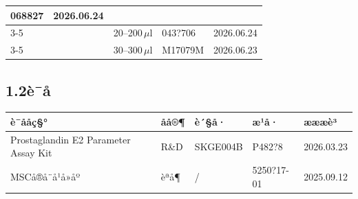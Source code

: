 \documentclass[UTF8,10pt,a4paper,fontset=fandol]{ctexart}
\newcommand{\fieldvalue}[1]{#1}
\newcommand{\handwritten}[1]{#1}
\begin{document}
\begin{tabularx}{\textwidth}{|X|X|X|X|X|}
\fieldvalue{\handwritten{068827}} &
\fieldvalue{\handwritten{2026.06.24}}
\\ \cline{3-5}
 & &
\fieldvalue{\handwritten{20--200\,\(\mu\)l}} &
\fieldvalue{\handwritten{043?706}} &
\fieldvalue{\handwritten{2026.06.24}}
\\ \cline{3-5}
 & &
\fieldvalue{\handwritten{30--300\,\(\mu\)l}} &
\fieldvalue{\handwritten{M17079M}} &
\fieldvalue{\handwritten{2026.06.23}}
\\ \hline
\end{tabularx}
\normalsize

\subsection*{1.2\quad è¯å}

\begin{tabularx}{\textwidth}{|X|l|X|X|X|}
\hline
è¯ååç§° & åå®¶ & è´§å· & æ¹å· & æææè³ \\ \hline
\fieldvalue{Prostaglandin E2 Parameter Assay Kit} &
\fieldvalue{R\&D} &
\fieldvalue{SKGE004B} &
\fieldvalue{\handwritten{P482?8}} &
\fieldvalue{\handwritten{2026.03.23}}
\\ \hline
\fieldvalue{MSCå®å¨å¹å»åº} &
\fieldvalue{èªå¶} &
\fieldvalue{/} &
\fieldvalue{\handwritten{5250?17-01}} &
\fieldvalue{\handwritten{2025.09.12}}
\\ \hline
\end{tabularx}
\end{document}
